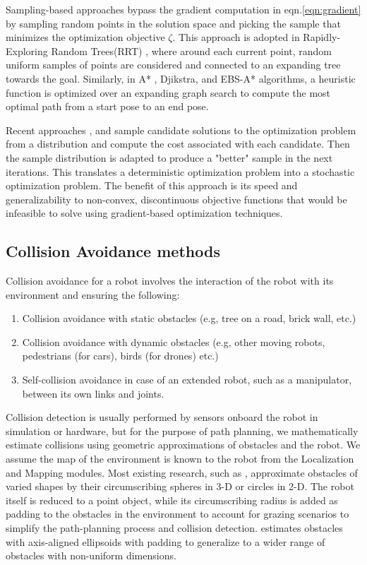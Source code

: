 Sampling-based approaches bypass the gradient computation in eqn.\ref{eqn:gradient} by sampling random points in the solution space and picking the sample that minimizes the optimization objective $\zeta$. This approach is adopted in Rapidly-Exploring Random Trees(RRT) \cite{RRT-og}, where around each current point, random uniform samples of points are considered and connected to an expanding tree towards the goal. Similarly, in A* \cite{A*}, Djikstra, and EBS-A* \cite{EBS-A*} algorithms, a heuristic function is optimized over an expanding graph search to compute the most optimal path from a start pose to an end pose. 

Recent approaches \cite{STORM}, \cite{iCEM} and \cite{VPSTO} sample candidate solutions to the optimization problem from a distribution and compute the cost associated with each candidate. Then the sample distribution is adapted to produce a "better" sample in the next iterations. This translates a deterministic optimization problem into a stochastic optimization problem. The benefit of this approach is its speed and generalizability to non-convex, discontinuous objective functions that would be infeasible to solve using gradient-based optimization techniques. 

\subsection{Collision Avoidance methods}

Collision avoidance for a robot involves the interaction of the robot with its environment and ensuring the following:

\begin{enumerate}
    \item Collision avoidance with static obstacles (e.g, tree on a road, brick wall, etc.)
    \item Collision avoidance with dynamic obstacles (e.g, other moving robots, pedestrians (for cars), birds (for drones) etc.)
    \item \label{point:self-collision}Self-collision avoidance in case of an extended robot, such as a manipulator, between its own links and joints.
\end{enumerate}

Collision detection is usually performed by sensors onboard the robot in simulation or hardware, but for the purpose of path planning, we mathematically estimate collisions using geometric approximations of obstacles and the robot. We assume the map of the environment is known to the robot from the Localization and Mapping modules. Most existing research, such as \cite{RVO}, approximate obstacles of varied shapes by their circumscribing spheres in 3-D or circles in 2-D. The robot itself is reduced to a point object, while its circumscribing radius is added as padding to the obstacles in the environment to account for grazing scenarios to simplify the path-planning process and collision detection. \cite{aks_ral21} estimates obstacles with axis-aligned ellipsoids with padding to generalize to a wider range of obstacles with non-uniform dimensions. 

